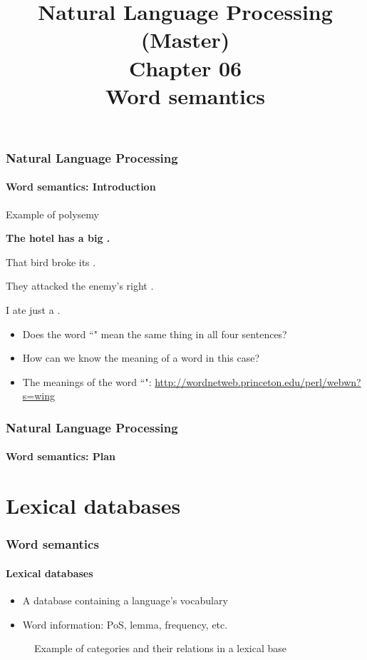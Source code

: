 \documentclass[xcolor=table]{beamer}
\title[ESI - NLP(master): 06- Word semantics]%
{Natural Language Processing (Master)\\Chapter 06\\Word semantics}
\begin{document}
	
\begin{frame}
\frametitle{Natural Language Processing}
\framesubtitle{Word semantics: Introduction}

\begin{exampleblock}{Example of polysemy}
	\begin{center}
		\Large\bfseries
			The hotel has a big .
			 
			That bird broke its .
			
			They attacked the enemy's right .
			
			I ate just a .
	\end{center}
\end{exampleblock}

\begin{itemize}
	\item Does the word ``" mean the same thing in all four sentences?
	\item How can we know the meaning of a word in this case?
	\item The meanings of the word ``": \url{http://wordnetweb.princeton.edu/perl/webwn?s=wing}
\end{itemize}

\end{frame}

\begin{frame}
\frametitle{Natural Language Processing}
\framesubtitle{Word semantics: Plan}

\begin{multicols}{2}
\tableofcontents
\end{multicols}
\end{frame}

\section{Lexical databases}

\begin{frame}
	\frametitle{Word semantics}
	\framesubtitle{Lexical databases}

	\begin{itemize}
		\item A database containing a language's vocabulary
		\item Word information: PoS, lemma, frequency, etc.
	\end{itemize}

	\begin{figure}
		\centering 
		\caption{Example of categories and their relations in a lexical base \cite{2019-white-al}}
	\end{figure}
	
\end{frame}
\end{document}
